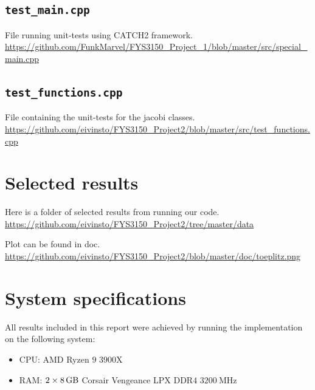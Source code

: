 \documentclass[reprint,english,notitlepage]{revtex4-1}  %
\begin{document}
\cprotect\subsection{\verb+test_main.cpp+} \label{A.6}
File running unit-tests using CATCH2 framework.
\url{https://github.com/FunkMarvel/FYS3150_Project_1/blob/master/src/special_main.cpp}

\cprotect\subsection{\verb+test_functions.cpp+} \label{A.7}
File containing the unit-tests for the jacobi classes.
\url{https://github.com/eivinsto/FYS3150_Project2/blob/master/src/test_functions.cpp}

\section{Selected results} \label{B}
Here is a folder of selected results from running our code.
\url{https://github.com/eivinsto/FYS3150_Project2/tree/master/data}

Plot can be found in doc.
\url{https://github.com/eivinsto/FYS3150_Project2/blob/master/doc/toeplitz.png}

\section{System specifications} \label{C}
All results included in this report were achieved by running the implementation on the following system:
\begin{itemize}
	\item CPU: AMD Ryzen \(9\) \(3900\)X
	\item RAM: \(2\times\SI{8}{\giga\byte}\) Corsair Vengeance LPX DDR\(4\) \(\SI{3200}{\mega\hertz}\)
\end{itemize}
\end{document}
